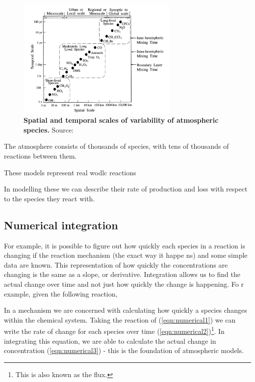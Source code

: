 \begin{figure}
  \centering
  \includegraphics[width=0.7\textwidth]{timescales.png}
  \caption{\textbf{Spatial and temporal scales of variability of atmospheric species.} Source: \citep{transporttime}}
  \label{fig:timescales}
\end{figure}



The atmosphere consists of thousands of species, with tens of thousands of reactions between them.

These models represent real wodlc reactions


In modelling these we can describe their rate of production and loss with respect to the species they react with.



\subsection{Numerical integration}

For example, it is possible to figure out how quickly each species in a reaction is changing if the reaction mechanism (the exact way it happe ns) and some simple data are known. This representation of how quickly the concentrations are changing is the same as a slope, or derivative. Integration allows us to find the actual change over time and not just how quickly the change is happening. Fo r example, given the following reaction,

In a mechanism we are concerned with calculating how quickly a species changes within the chemical system. Taking the reaction of  (\autoref{eqn:numerical1}) we can write the rate of change for each species over time (\autoref{eqn:numerical2})\footnote{This is also known as the flux.}. In integrating this equation, we are able to calculate the actual change in concentration (\autoref{eqn:numerical3}) - this is the foundation of atmospheric models.


